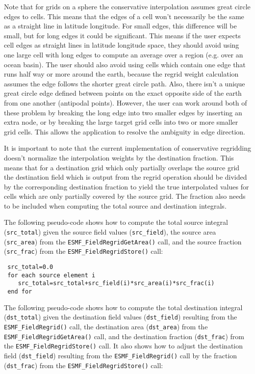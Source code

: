  Note that for grids on a sphere the conservative interpolation assumes great circle edges to cells. This means that the
 edges of a cell won't necessarily be
 the same as a straight line in latitude longitude. For small edges, this difference will be small, but for long edges it
 could be significant. This means if
 the user expects cell edges as straight lines in latitude longitude space, they should avoid using one large cell with 
 long edges to compute an average over a region (e.g. over an ocean basin). The 
 user should also avoid using cells which contain one edge that runs half way or more around the earth, because the 
 regrid weight calculation assumes the 
 edge follows the shorter great circle path. Also, there isn't a unique great circle edge defined between points on the 
 exact opposite side of the earth from one another (antipodal points). 
 However, the user can work around both of these problem by breaking the long edge into two smaller edges by inserting 
 an extra node, or by breaking the large target grid cells 
 into two or more smaller grid cells. This allows the application to resolve the ambiguity in edge direction. 

 It is important to note that the current implementation of conservative regridding doesn't normalize the interpolation 
 weights by the destination fraction. This means that for a destination
 grid which only partially overlaps the source grid the destination field which is output from the regrid operation 
 should be divided by the corresponding destination fraction to yield the 
 true interpolated values for cells which are only partially covered by the source grid. The fraction also needs to be 
 included when computing the total source and destination integrals. 

 The following pseudo-code shows how to compute the total source integral ({\tt src\_total}) given the source field values
 ({\tt src\_field}), the source area ({\tt src\_area}) from the {\tt ESMF\_FieldRegridGetArea()} call, and
 the source fraction ({\tt src\_frac}) from the {\tt ESMF\_FieldRegridStore()} call:

\begin{verbatim}
 src_total=0.0
 for each source element i
    src_total=src_total+src_field(i)*src_area(i)*src_frac(i)
 end for
\end{verbatim}

 The following pseudo-code shows how to compute the total destination integral ({\tt dst\_total}) given the
 destination field values ({\tt dst\_field}) resulting
 from the {\tt ESMF\_FieldRegrid()} call, the destination area ({\tt dst\_area}) from the {\tt ESMF\_FieldRegridGetArea()}
 call,
 and the destination fraction ({\tt dst\_frac}) from the {\tt ESMF\_FieldRegridStore()} call. It also 
 shows how to adjust the destination field ({\tt dst\_field}) resulting from the {\tt ESMF\_FieldRegrid()} call by the
 fraction ({\tt dst\_frac}) from the {\tt ESMF\_FieldRegridStore()} call: 

